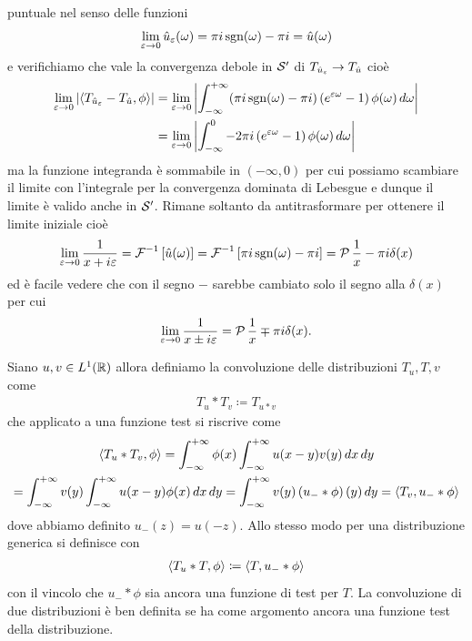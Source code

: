 \begin{example}
  puntuale nel senso delle funzioni 
  \begin{align}
    \lim_{\eps \to 0} \hat{u}_\eps(\omega) = \pi i \sgn(\omega) -\pi i = \hat{u}(\omega)
  \end{align}
  e verifichiamo che vale la convergenza debole in $ \S' $ di $ T_{\hat{u}_\eps} \to T_{\hat{u}} $ cioè
  \begin{align}
    \lim_{\eps \to 0} \abs{\sca{T_{\hat{u}_\eps} - T_{\hat{u}}, \phi}} 
    &= \lim_{\eps \to 0} \abs{\int_{-\infty}^{+\infty} (\pi i \sgn(\omega) -\pi i)\left( e^{\eps \omega} - 1 \right)\phi(\omega)\,d\omega}
    \\
    &= \lim_{\eps \to 0} \abs{\int_{-\infty}^{0} -2\pi i\left( e^{\eps \omega} - 1 \right)\phi(\omega)\,d\omega}
  \end{align}
  ma la funzione integranda è sommabile in $ (- \infty, 0) $ per cui possiamo scambiare il limite con l'integrale per la convergenza dominata di Lebesgue 
  e dunque il limite è valido anche in $ \S' $. Rimane soltanto da antitrasformare per ottenere il limite iniziale cioè
  \begin{align}
    \lim_{\eps \to 0} \frac{1}{x + i\eps} = \F^{-1}\left[ \hat{u}(\omega) \right] 
    = \F^{-1}\left[ \pi i \sgn(\omega) -\pi i \right] = \P\frac1x - \pi i \delta(x)
  \end{align}
  ed è facile vedere che con il segno $ - $ sarebbe cambiato solo il segno alla $ \delta(x) $ per cui 
  \begin{align}
    \lim_{\eps \to 0} \frac1{x\pm i\eps} = \P\frac1x \mp \pi i \delta(x).
  \end{align}
\end{example}

\begin{definition}
  Siano $ u,v \in L^1(\R) $ allora definiamo la convoluzione delle distribuzioni $ T_u,T,v $ come 
  \begin{align}
    T_u * T_v \coloneq T_{u*v}
  \end{align}
  che applicato a una funzione test si riscrive come 
  \begin{gather}
    \sc{T_u * T_v,\phi} = \int_{-\infty}^{+\infty} \phi(x) \int_{-\infty}^{+\infty} u(x-y) v(y) \,dx \,dy
    \\
    = \int_{-\infty}^{+\infty} v(y) \int_{-\infty}^{+\infty} u(x-y) \phi(x) \,dx \,dy
    = \int_{-\infty}^{+\infty} v(y) \left( u_- * \phi \right)(y)\,dy = \sc{T_v, u_-*\phi}
  \end{gather}
  dove abbiamo definito $ u_{-}(z) = u(-z) $. Allo stesso modo per una distribuzione generica si definisce con 
  \begin{align}
    \sc{T_u * T, \phi} \coloneq \sc{T, u_-*\phi} 
  \end{align}
  con il vincolo che $ u_- * \phi $ sia ancora una funzione di test per $ T $. La convoluzione di due distribuzioni è ben definita se ha come argomento  
  ancora una funzione test della distribuzione.
\end{definition}

